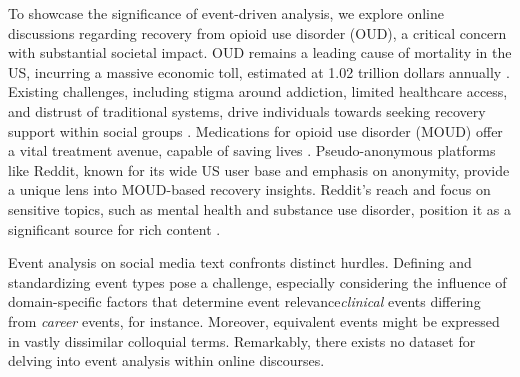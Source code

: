 \documentclass[letterpaper]{article} %
\begin{document}
To showcase the significance of event-driven analysis, we explore online discussions regarding recovery from opioid use disorder (OUD), a critical concern with substantial societal impact. OUD remains a leading cause of mortality in the US, incurring a massive economic toll, estimated at 1.02 trillion dollars annually \cite{FLORENCE2021108350}. Existing challenges, including stigma around addiction, limited healthcare access, and distrust of traditional systems, drive individuals towards seeking recovery support within social groups \cite{10.1001/jama.2014.2147}. Medications for opioid use disorder (MOUD) offer a vital treatment avenue, capable of saving lives \cite{mooney2020patient}. Pseudo-anonymous platforms like Reddit, known for its wide US user base and emphasis on anonymity, provide a unique lens into MOUD-based recovery insights. Reddit's reach and focus on sensitive topics, such as mental health and substance use disorder, position it as a significant source for rich content \cite{romano2023themedriven, 10.1145/3359249,sharma2020engagement}.

Event analysis on social media text confronts distinct hurdles. Defining and standardizing event types pose a challenge, especially considering the influence of domain-specific factors that determine event relevance\textit{clinical} events differing from \textit{career} events, for instance. Moreover, equivalent events might be expressed in vastly dissimilar colloquial terms. Remarkably, there exists no dataset for delving into event analysis within online discourses.

\end{document}
